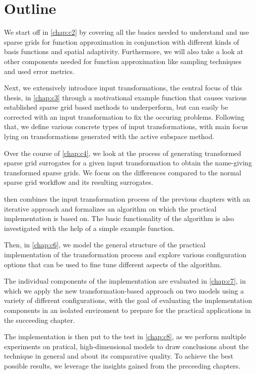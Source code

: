 \documentclass[
  a4paper,  %
  twoside,  %
  bibliography=totoc,
  headsepline,
  cleardoublepage=empty,
  parskip=half,
  draft=false
]{scrbook}
\begin{document}
\section{Outline}

We start off in \cref{chap:c2} by covering all the basics needed to understand and use sparse grids for function approximation in conjunction with different kinds of basis functions and spatial adaptivity.
Furthermore, we will also take a look at other components needed for function approximation like sampling techniques and used error metrics.

Next, we extensively introduce input transformations, the central focus of this thesis, in \cref{chap:c3} through a motivational example function that causes various established sparse grid based methods to underperform, but can easily be corrected with an input transformation to fix the occuring  problems.
Following that, we define various concrete types of input transformations, with main focus lying on transformations generated with the active subspace method.

Over the course of \cref{chap:c4}, we look at the process of generating transformed sparse grid surrogates for a given input transformation to obtain the name-giving transformed sparse grids.
We focus on the differences compared to the normal sparse grid workflow and its resulting surrogates.

 then combines the input transformation process of the previous chapters with an iterative approach and formalizes an algorithm on which the practical implementation is based on.
The basic functionality of the algorithm is also investigated with the help of a simple example function.

Then, in \cref{chap:c6}, we model the general structure of the practical implementation of the transformation process and explore various configuration options that can be used to fine tune different aspects of the algorithm.

The individual components of the implementation are evaluated in \cref{chap:c7}, in which we apply the new transformation-based approach on two models using a variety of different configurations, with the goal of evaluating the implementation components in an isolated enviroment to prepare for the practical applications in the succeeding chapter.

The implementation is then put to the test in \cref{chap:c8}, as we perform multiple experiments on pratical, high-dimensional models to draw conclusions about the technique in general and about its comparative quality.
To achieve the best possible results, we leverage the insights gained from the preceeding chapters.
\end{document}
